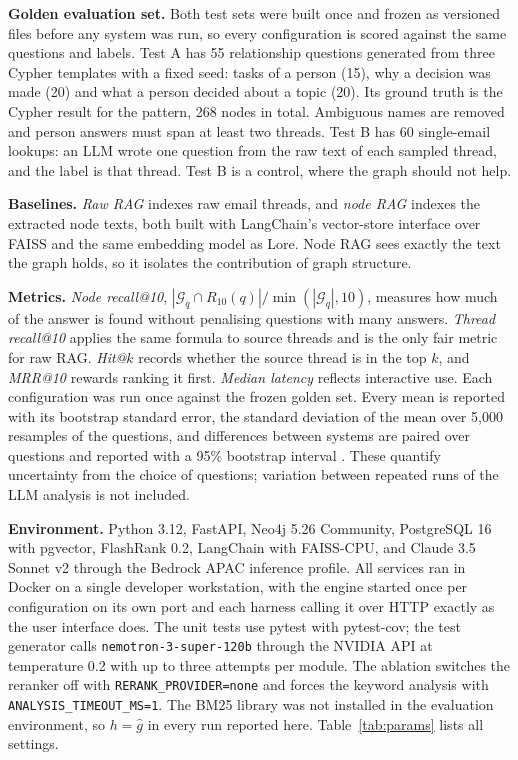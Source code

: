 \documentclass[12pt,onecolumn,draftclsnofoot]{IEEEtran}
\begin{document}
\textbf{Golden evaluation set.} Both test sets were built once and frozen as versioned files before any system was run, so every configuration is scored against the same questions and labels. Test A has 55 relationship questions generated from three Cypher templates with a fixed seed: tasks of a person (15), why a decision was made (20) and what a person decided about a topic (20). Its ground truth is the Cypher result for the pattern, 268 nodes in total. Ambiguous names are removed and person answers must span at least two threads. Test B has 60 single-email lookups: an LLM wrote one question from the raw text of each sampled thread, and the label is that thread. Test B is a control, where the graph should not help.

\textbf{Baselines.} \emph{Raw RAG} indexes raw email threads, and \emph{node RAG} indexes the extracted node texts, both built with LangChain's vector-store interface \cite{langchain2026vectorstores} over FAISS \cite{johnson2017faiss} and the same embedding model as Lore. Node RAG sees exactly the text the graph holds, so it isolates the contribution of graph structure.

\textbf{Metrics.} \emph{Node recall@10}, $|\mathcal{G}_q\cap R_{10}(q)|/\min(|\mathcal{G}_q|,10)$, measures how much of the answer is found without penalising questions with many answers. \emph{Thread recall@10} applies the same formula to source threads and is the only fair metric for raw RAG. \emph{Hit@$k$} records whether the source thread is in the top $k$, and \emph{MRR@10} rewards ranking it first. \emph{Median latency} reflects interactive use. Each configuration was run once against the frozen golden set. Every mean is reported with its bootstrap standard error, the standard deviation of the mean over 5,000 resamples of the questions, and differences between systems are paired over questions and reported with a 95\% bootstrap interval \cite{efron1993bootstrap}. These quantify uncertainty from the choice of questions; variation between repeated runs of the LLM analysis is not included.

\textbf{Environment.} Python 3.12, FastAPI, Neo4j 5.26 Community, PostgreSQL 16 with pgvector, FlashRank 0.2, LangChain with FAISS-CPU, and Claude 3.5 Sonnet v2 through the Bedrock APAC inference profile. All services ran in Docker on a single developer workstation, with the engine started once per configuration on its own port and each harness calling it over HTTP exactly as the user interface does. The unit tests use pytest with pytest-cov; the test generator calls \texttt{nemotron-3-super-120b} through the NVIDIA API at temperature 0.2 with up to three attempts per module. The ablation switches the reranker off with \texttt{RERANK\_PROVIDER=none} and forces the keyword analysis with \texttt{ANALYSIS\_TIMEOUT\_MS=1}. The BM25 library was not installed in the evaluation environment, so $h=\hat{g}$ in every run reported here. Table~\ref{tab:params} lists all settings.
\end{document}
